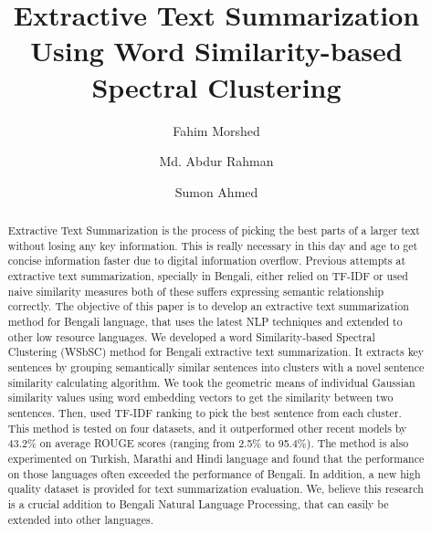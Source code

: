 \documentclass[acmlarge]{acmart}
\begin{document}
\title{Extractive Text Summarization Using Word Similarity-based Spectral Clustering}

\author{Fahim Morshed}

\author{Md. Abdur Rahman}

\author{Sumon Ahmed}

\renewcommand{\shortauthors}{Morshed et al.}

\begin{abstract}
  Extractive Text Summarization is the process of picking the best parts of a  larger text without losing any key information. This is really necessary in this day and age to get concise information faster due to digital information overflow. Previous attempts at extractive text summarization, specially in Bengali, either relied on TF-IDF or used naive similarity measures both of these suffers expressing semantic relationship correctly. The objective of this paper is to develop an extractive text summarization method  for Bengali language, that uses the latest NLP techniques and extended to other low resource languages. We developed a word Similarity-based Spectral Clustering (WSbSC) method for  Bengali extractive text summarization. It extracts key sentences by grouping semantically similar sentences into clusters  with a novel sentence similarity calculating algorithm. We took the geometric means of individual Gaussian similarity values using word embedding vectors to get the similarity between two sentences. Then, used TF-IDF ranking to pick the best sentence from each cluster. This method is tested on four datasets, and it outperformed other recent models by 43.2\% on average ROUGE scores (ranging from 2.5\% to 95.4\%). The method is also experimented on Turkish, Marathi and Hindi language and found that the performance on those languages often exceeded the performance of Bengali. In addition, a new high quality dataset is provided for text summarization evaluation. We, believe this research is a crucial addition to Bengali Natural Language Processing, that can easily be extended into other languages.
\end{abstract}
\end{document}
